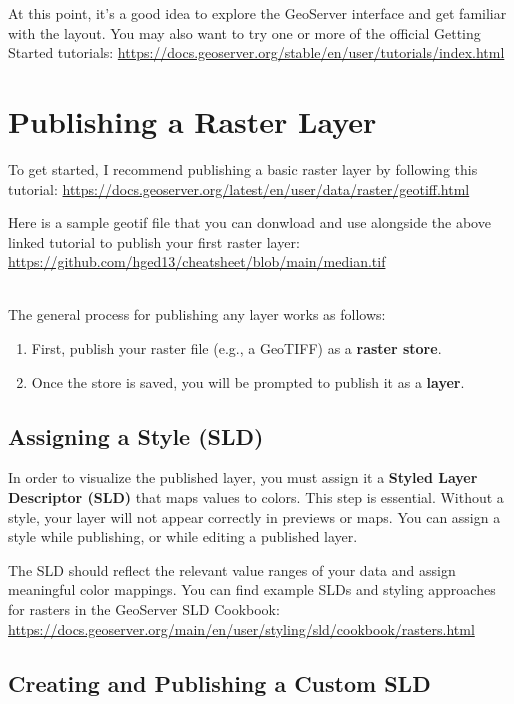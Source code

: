 \documentclass{article}
\begin{document}
At this point, it’s a good idea to explore the GeoServer interface and get familiar with the layout. You may also want to try one or more of the official Getting Started tutorials:  
\url{https://docs.geoserver.org/stable/en/user/tutorials/index.html}


\section{Publishing a Raster Layer}

To get started, I recommend publishing a basic raster layer by following this tutorial:  
\url{https://docs.geoserver.org/latest/en/user/data/raster/geotiff.html}

Here is a sample geotif file that you can donwload and use alongside the above linked tutorial to publish your first raster layer: \url{https://github.com/hged13/cheatsheet/blob/main/median.tif}



\\

The general process for publishing any layer works as follows:

\begin{enumerate}
  \item First, publish your raster file (e.g., a GeoTIFF) as a \textbf{raster store}.
  \item Once the store is saved, you will be prompted to publish it as a \textbf{layer}.
\end{enumerate}

\subsection*{Assigning a Style (SLD)}

In order to visualize the published layer, you must assign it a \textbf{Styled Layer Descriptor (SLD)} that maps values to colors. This step is essential. Without a style, your layer will not appear correctly in previews or maps. You can assign a style while publishing, or while editing a published layer.

The SLD should reflect the relevant value ranges of your data and assign meaningful color mappings. You can find example SLDs and styling approaches for rasters in the GeoServer SLD Cookbook:  \\
\url{https://docs.geoserver.org/main/en/user/styling/sld/cookbook/rasters.html} 

\subsection*{Creating and Publishing a Custom SLD}
\end{document}
